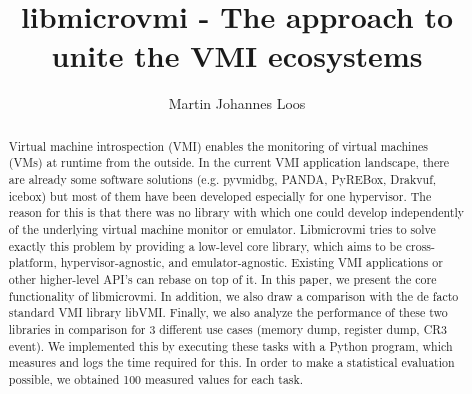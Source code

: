 \documentclass[sigconf]{acmart}
\begin{document}
\renewcommand\footnotetextcopyrightpermission[1]{} %
\pagestyle{plain} %


\title{libmicrovmi - The approach to unite the VMI ecosystems}
\author{Martin Johannes Loos}


\begin{abstract}
Virtual machine introspection (VMI) enables the monitoring of virtual machines (VMs) at runtime from the outside.
In the current VMI application landscape, there are already some software solutions (e.g. pyvmidbg, PANDA, PyREBox, Drakvuf, icebox) but most of them have been developed especially for one hypervisor.
The reason for this is that there was no library with which one could develop independently of the underlying virtual machine monitor or emulator.
Libmicrovmi tries to solve exactly this problem by providing a low-level core library, which aims to be cross-platform, hypervisor-agnostic, and emulator-agnostic. Existing VMI applications or other higher-level API's can rebase on top of it.
In this paper, we present the core functionality of libmicrovmi. 
In addition, we also draw a comparison with the de facto standard VMI library libVMI.
Finally, we also analyze the performance of these two libraries in comparison for 3 different use cases (memory dump, register dump, CR3 event). We implemented this by executing these tasks with a Python program, which measures and logs the time required for this. In order to make a statistical evaluation possible, we obtained 100 measured values ​​for each task.
\end{abstract}


\maketitle
\end{document}
